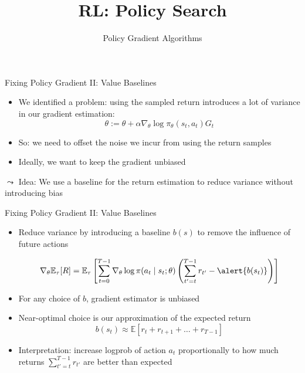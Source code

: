 \documentclass[aspectratio=169]{../latex_main/tntbeamer}  %
\title[RL: Policy Gradient]{RL: Policy Search}
\subtitle{Policy Gradient Algorithms}
\begin{document}
	
	\maketitle
\begin{frame}[c]{Fixing Policy Gradient II: Value Baselines}

\begin{itemize}
	\item We identified a problem: using the sampled return introduces a lot of variance in our gradient estimation:
 $$\theta := \theta + \alpha \nabla_\theta \log \pi_\theta (s_t, a_t) G_t $$
    \item So: we need to offset the noise we incur from using the return samples
    \item Ideally, we want to keep the gradient unbiased
\end{itemize}
	$\leadsto$ \alert{Idea}: We use a baseline for the return estimation to reduce variance without introducing bias
\end{frame}
\begin{frame}[c]{Fixing Policy Gradient II: Value Baselines}

\begin{itemize}
	\item Reduce variance by introducing a baseline $b(s)$ to remove the influence of future actions
	
	$$\nabla_\theta \mathbb{E}_\tau [R] = \mathbb{E}_\tau \left[ \sum_{t=0}^{T-1} \nabla_\theta \log \pi(a_t \mid s_t; \theta) \left( \sum_{t'=t}^{T-1} r_{t'} - \alert{b(s_t)} \right) \right] $$
	
	\item For any choice of $b$, gradient estimator is unbiased
	\item Near-optimal choice is our approximation of the expected return
	$$b(s_t) \approx \mathbb{E} [r_t + r_{t+1} +\ldots + r_{T-1}] $$
	
	\item Interpretation: increase logprob of action $a_t$ proportionally to how much returns $\sum_{t'=t}^{T-1} r_{t'}$ are better than expected
	
\end{itemize}
\end{frame}
\end{document}
